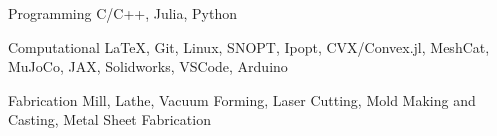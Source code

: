 

\begin{cvskills}

  \cvskill
    {Programming} %
    {C/C++, Julia, Python} %

  \cvskill
    {Computational} %
    {\LaTeX, Git, Linux, SNOPT, Ipopt, CVX/Convex.jl, MeshCat, MuJoCo, JAX, Solidworks, VSCode, Arduino} %

  \cvskill
    {Fabrication} %
    {Mill, Lathe, Vacuum Forming, Laser Cutting, Mold Making and Casting, Metal Sheet Fabrication} %

\end{cvskills}

